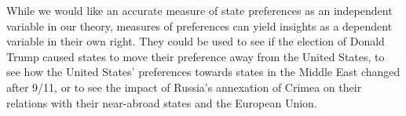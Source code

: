 While we would like an accurate measure of state preferences as an independent variable in our theory, measures of preferences can yield insights as a dependent variable in their own right. They could be used to see if the election of Donald Trump caused states to move their preference away from the United States, to see how the United States' preferences towards states in the Middle East changed after 9/11, or to see the impact of Russia's annexation of Crimea on their relations with their near-abroad states and the European Union.

